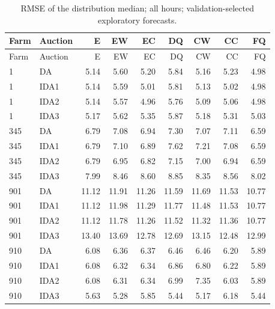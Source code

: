 \documentclass[11pt,a4paper]{article}
\begin{document}
\begin{longtable}{llrrrrrrr}
\caption{RMSE of the distribution median; all hours; validation-selected exploratory forecasts.}\\
\toprule Farm & Auction & E & EW & EC & DQ & CW & CC & FQ \\
\midrule\endfirsthead
\toprule Farm & Auction & E & EW & EC & DQ & CW & CC & FQ \\
\midrule\endhead
1 & DA & 5.14 & 5.60 & 5.20 & 5.84 & 5.16 & 5.23 & 4.98 \\
1 & IDA1 & 5.14 & 5.59 & 5.01 & 5.81 & 5.13 & 5.02 & 4.98 \\
1 & IDA2 & 5.14 & 5.57 & 4.96 & 5.76 & 5.09 & 5.06 & 4.98 \\
1 & IDA3 & 5.17 & 5.62 & 5.35 & 5.87 & 5.18 & 5.31 & 5.03 \\
\midrule
345 & DA & 6.79 & 7.08 & 6.94 & 7.30 & 7.07 & 7.11 & 6.59 \\
345 & IDA1 & 6.79 & 7.10 & 6.89 & 7.62 & 7.21 & 7.08 & 6.59 \\
345 & IDA2 & 6.79 & 6.95 & 6.82 & 7.15 & 7.00 & 6.94 & 6.59 \\
345 & IDA3 & 7.99 & 8.46 & 8.60 & 8.85 & 8.35 & 8.56 & 8.02 \\
\midrule
901 & DA & 11.12 & 11.91 & 11.26 & 11.59 & 11.69 & 11.53 & 10.77 \\
901 & IDA1 & 11.12 & 11.98 & 11.29 & 11.77 & 11.48 & 11.53 & 10.77 \\
901 & IDA2 & 11.12 & 11.78 & 11.26 & 11.52 & 11.32 & 11.36 & 10.77 \\
901 & IDA3 & 13.40 & 13.69 & 12.78 & 12.69 & 13.15 & 12.48 & 12.99 \\
\midrule
910 & DA & 6.08 & 6.36 & 6.37 & 6.46 & 6.46 & 6.20 & 5.89 \\
910 & IDA1 & 6.08 & 6.32 & 6.34 & 6.86 & 6.80 & 6.22 & 5.89 \\
910 & IDA2 & 6.08 & 6.31 & 6.34 & 6.99 & 7.35 & 6.03 & 5.89 \\
910 & IDA3 & 5.63 & 5.28 & 5.85 & 5.44 & 5.17 & 6.18 & 5.44 \\
\midrule
\bottomrule\end{longtable}
\normalsize
\small
\end{document}
